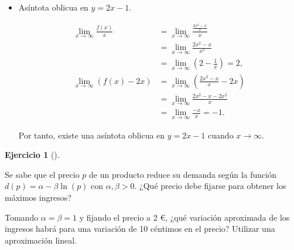 \documentclass[
  spanish,
  a4paper,
]{scrreport}
\theoremstyle{definition}
\newtheorem{exercise}{Ejercicio}[chapter]
\theoremstyle{remark}
\begin{document}
\begin{tcolorbox}
\begin{itemize}
  \[ 
   \lim_{x \to -\infty} f(x) = \lim_{x \to -\infty} \frac{x}{x-2} = \lim_{x \to -\infty} \frac{1}{1-\frac{2}{x}} = 1.
   \]

  Por tanto, existe una asíntota horizontal en \(y=1\) cuando
  \(x \to -\infty\).
\item
  Asíntota oblicua en \(y=2x-1\).

  \begin{align*}
   \lim_{x \to \infty} \frac{f(x)}{x} 
   &= \lim_{x \to \infty} \frac{\frac{2x^2 - x}{x}}{x} \\
   &= \lim_{x \to \infty} \frac{2x^2 - x}{x^2} \\  
   &= \lim_{x \to \infty} \left(2 - \frac{1}{x}\right) = 2,\\
   \lim_{x\to \infty} \left(f(x) - 2x\right) 
   &= \lim_{x\to \infty} \left(\frac{2x^2 - x}{x} - 2x\right) \\
   &= \lim_{x\to \infty} \frac{2x^2 -x - 2x^2}{x} \\
   &= \lim_{x\to \infty} \frac{-x}{x} 
   = -1.
   \end{align*}

  Por tanto, existe una asíntota oblicua en \(y=2x-1\) cuando
  \(x \to \infty\).
\end{itemize}

\end{tcolorbox}

\begin{exercise}[]\protect\hypertarget{exr-8}{}\label{exr-8}

Se sabe que el precio \(p\) de un producto reduce su demanda según la
función \(d(p) = \alpha - \beta\ln(p)\) con \(\alpha, \beta >0\). ¿Qué
precio debe fijarse para obtener los máximos ingresos?

Tomando \(\alpha=\beta=1\) y fijando el precio a 2 €, ¿qué variación
aproximada de los ingresos habrá para una variación de 10 céntimos en el
precio? Utilizar una aproximación lineal.

\end{exercise}
\end{document}
